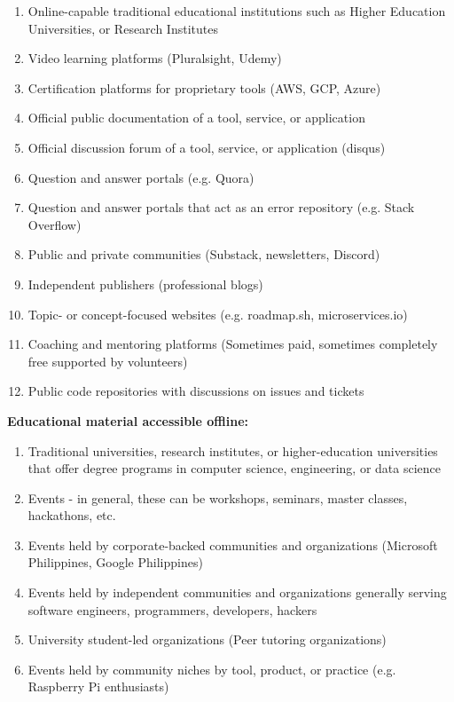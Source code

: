 \documentclass[conference]{IEEEtran}
\begin{document}
\begin{enumerate}
  \item Online-capable traditional educational institutions such as Higher Education Universities, or Research Institutes
  \item Video learning platforms (Pluralsight, Udemy)
  \item Certification platforms for proprietary tools (AWS, GCP, Azure)
  \item Official public documentation of a tool, service, or application
  \item Official discussion forum of a tool, service, or application (disqus)
  \item Question and answer portals (e.g. Quora) 
  \item Question and answer portals that act as an error repository (e.g. Stack Overflow)
  \item Public and private communities (Substack, newsletters, Discord)
  \item Independent publishers (professional blogs)
  \item Topic- or concept-focused websites (e.g. roadmap.sh, microservices.io)
  \item Coaching and mentoring platforms (Sometimes paid, sometimes completely free supported by volunteers)
  \item Public code repositories with discussions on issues and tickets
\end{enumerate}

\textbf{Educational material accessible offline:}

\begin{enumerate}
  \item Traditional universities, research institutes, or higher-education 
  universities that offer degree programs in computer science, engineering,
  or data science
  \item Events - in general, these can be workshops, seminars, master classes, hackathons, etc.
  \item Events held by corporate-backed communities and organizations (Microsoft Philippines, Google Philippines)
  \item Events held by independent communities and organizations generally serving software engineers, programmers, developers, hackers
  \item University student-led organizations (Peer tutoring organizations)
  \item Events held by community niches by tool, product, or practice (e.g. Raspberry Pi enthusiasts)
\end{enumerate}
\end{document}
